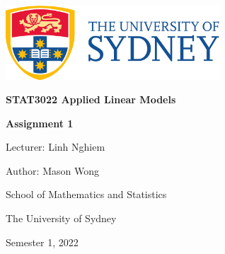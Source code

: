 \includegraphics[width=8cm]{./UsydLogo}

\vspace{1cm}


\horline

\vspace{0.3cm}

{\centering\bfseries \Large \textsc{STAT3022} Applied Linear Models

}

\vspace{0.2cm}

\horline

\vspace{6cm}

{\large \centering \bfseries Assignment 1

}

{\centering

\vspace{1cm}

Lecturer: Linh Nghiem

Author: Mason Wong

\vspace{1cm}

School of Mathematics and Statistics

The University of Sydney

\vfill

Semester 1, 2022\newpage

}
